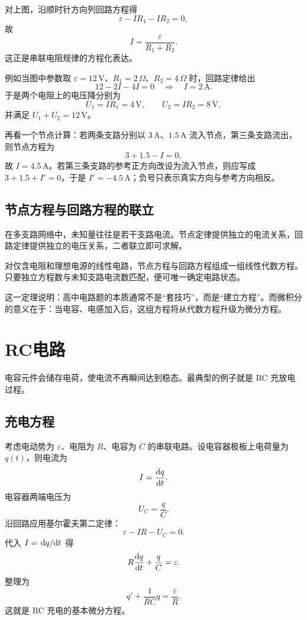 对上图，沿顺时针方向列回路方程得
\[
\varepsilon-IR_1-IR_2=0,
\]
故
\[
I=\frac{\varepsilon}{R_1+R_2}.
\]
这正是串联电阻规律的方程化表达。

例如当图中参数取 $\varepsilon=12\,\text{V}$、$R_1=2\,\Omega$、$R_2=4\,\Omega$ 时，回路定律给出
\[
12-2I-4I=0 \quad\Rightarrow\quad I=2\,\text{A}.
\]
于是两个电阻上的电压降分别为
\[
U_1=IR_1=4\,\text{V},
\qquad
U_2=IR_2=8\,\text{V},
\]
并满足 $U_1+U_2=12\,\text{V}$。

再看一个节点计算：若两条支路分别以 $3\,\text{A}$、$1.5\,\text{A}$ 流入节点，第三条支路流出，则节点方程为
\[
3+1.5-I=0,
\]
故 $I=4.5\,\text{A}$。若第三条支路的参考正方向改设为流入节点，则应写成 $3+1.5+I'=0$，于是 $I'=-4.5\,\text{A}$；负号只表示真实方向与参考方向相反。

\subsection{节点方程与回路方程的联立}

在多支路网络中，未知量往往是若干支路电流。节点定律提供独立的电流关系，回路定律提供独立的电压关系，二者联立即可求解。

\begin{theorem}
对仅含电阻和理想电源的线性电路，节点方程与回路方程组成一组线性代数方程。只要独立方程数与未知支路电流数匹配，便可唯一确定电路状态。
\end{theorem}

这一定理说明：高中电路题的本质通常不是“套技巧”，而是“建立方程”。而微积分的意义在于：当电容、电感加入后，这组方程将从代数方程升级为微分方程。

\section{RC电路}

电容元件会储存电荷，使电流不再瞬间达到稳态。最典型的例子就是 RC 充放电过程。

\subsection{充电方程}

考虑电动势为 $\varepsilon$、电阻为 $R$、电容为 $C$ 的串联电路。设电容器极板上电荷量为 $q(t)$，则电流为
\[
I=\dv{q}{t}.
\]
电容器两端电压为
\[
U_C=\frac{q}{C}.
\]
沿回路应用基尔霍夫第二定律：
\[
\varepsilon-IR-U_C=0.
\]
代入 $I=\dv*{q}{t}$ 得
\[
R\dv{q}{t}+\frac{q}{C}=\varepsilon.
\]
整理为
\[
q'+\frac{1}{RC}q=\frac{\varepsilon}{R}.
\]
这就是 RC 充电的基本微分方程。

